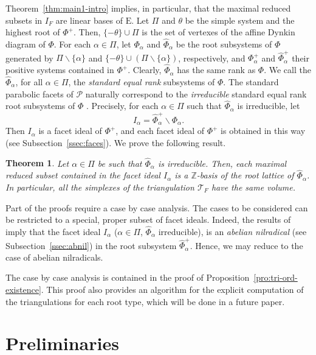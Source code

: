 \documentclass[10pt]{amsart}
\newtheorem{thm}{Theorem}[section]
\theoremstyle{definition}
\theoremstyle{remark}
\newcommand\wh{\widehat}
\newcommand\mc{\mathcal}
\newcommand\smeno{\smallsetminus}
\newcommand\ganz{\mathbb Z}
\newcommand\pol{\mathcal P}
\newcommand\al{\alpha}
\begin{document}
\par
Theorem~\ref{thm:main1-intro} implies, in particular, that the maximal reduced subsets in $I_F$ are linear bases of $\mathrm E$. 
Let $\Pi$ and $\theta$ be the simple system and the highest root of $\Phi^+$. 
Then, $\{-\theta\}\cup \Pi$ is the set of vertexes of the affine Dynkin diagram of $\Phi$.
For each $\al\in \Pi$,  let $\Phi_{\al}$ and $\wh\Phi_{\al}$ be the root subsystems of $\Phi$ generated by $\Pi\smeno\{\al\}$ and  $\{-\theta\}\cup (\Pi\smeno\{\al\})$, respectively, and $\Phi_\al^+$ and $\wh\Phi_{\al}^+$ their positive systems contained in $\Phi^+$.
Clearly, $\wh\Phi_{\al}$ has the same rank as $\Phi$.
We call the $\wh\Phi_\al$, for all $\al\in \Pi$, the {\it standard equal rank} subsystems of $\Phi$.
The standard parabolic facets of $\pol$ naturally correspond to the {\it irreducible} standard equal rank root  subsystems of $\Phi$ \cite{CM1}. 
Precisely, for each $\al\in \Pi$ such that $\wh\Phi_{\al}$ is irreducible,  let
$$
I_\al=\wh\Phi_{\al}^+\smeno \Phi_\al.
$$ 
Then $I_\al$ is a facet ideal of $\Phi^+$, and each facet ideal of $\Phi^+$ is obtained in this way (see Subsection~\ref{ssec:faces}). We prove the following result.


\begin{thm}\label{thm:main2-intro}
Let $\al\in \Pi$ be such that $\wh\Phi_{\al}$ is irreducible.
Then, each  maximal reduced subset contained in the facet ideal $I_\al$ is a $\ganz$-basis of the root lattice of $\wh\Phi_{\al}$.  
In particular, all the simplexes of the triangulation  $\mc T_F$  have the same volume.
\end{thm}


\par
Part of the proofs require a case by case analysis. 
The cases to be considered can be restricted to a special, proper subset of facet ideals. 
Indeed, the results of \cite{CM1} imply that the facet ideal  $I_\al$  ($\al\in \Pi$,  $\wh\Phi_{\al}$ irreducible), is an {\it abelian nilradical} (see Subsection~\ref{ssec:abnil}) in the root subsystem $\wh\Phi_\al^+$.  
Hence, we may reduce to the case of abelian nilradicals.

\par
The case by case analysis is contained in the proof of Proposition~\ref{pro:tri-ord-existence}.
This proof also provides an algorithm for the explicit computation of the triangulations for each root type, which will be done in a future paper. 

\section{Preliminaries}\label{sec:preli}
\end{document}
